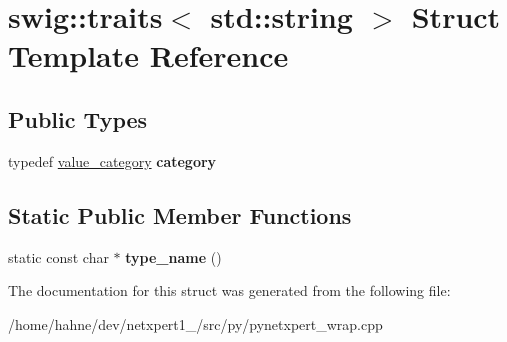 \hypertarget{structswig_1_1traits_3_01std_1_1string_01_4}{}\section{swig\+:\+:traits$<$ std\+:\+:string $>$ Struct Template Reference}
\label{structswig_1_1traits_3_01std_1_1string_01_4}
\subsection*{Public Types}
\begin{DoxyCompactItemize}
\item 
typedef \hyperlink{structswig_1_1value__category}{value\+\_\+category} {\bfseries category}\hypertarget{structswig_1_1traits_3_01std_1_1string_01_4_aec31e973b1220342e0b89c6b8fe96684}{}\label{structswig_1_1traits_3_01std_1_1string_01_4_aec31e973b1220342e0b89c6b8fe96684}

\end{DoxyCompactItemize}
\subsection*{Static Public Member Functions}
\begin{DoxyCompactItemize}
\item 
static const char $\ast$ {\bfseries type\+\_\+name} ()\hypertarget{structswig_1_1traits_3_01std_1_1string_01_4_ab4142e71b21ccbad9a8161a116f660d2}{}\label{structswig_1_1traits_3_01std_1_1string_01_4_ab4142e71b21ccbad9a8161a116f660d2}

\end{DoxyCompactItemize}


The documentation for this struct was generated from the following file\+:\begin{DoxyCompactItemize}
\item 
/home/hahne/dev/netxpert1\+\_/src/py/pynetxpert\+\_\+wrap.\+cpp\end{DoxyCompactItemize}

